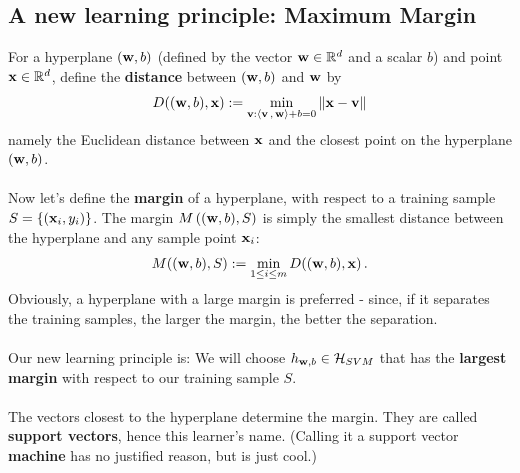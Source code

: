 \subsection{A new learning principle: Maximum Margin}


For a hyperplane $(\mathbf{w},b)$ (defined by the vector $\mathbf{w}\in\mathbb{R}^d$ and a
scalar $b$) and
point $\mathbf{x}\in\mathbb{R}^d$, define the {\bf distance} between $(\mathbf{w},b)$ and
$\mathbf{w}$ by 
\[
  D( (\mathbf{w},b) , \mathbf{x}) := \min_{\mathbf{v}:{\left\langle \mathbf{v}\,,\,\mathbf{w} \right\rangle}  +b=0  } \left\| \mathbf{x}-\mathbf{v}\right\|
\]
namely the Euclidean distance between $\mathbf{x}$ and the closest point on the
hyperplane $(\mathbf{w},b)$.
\\~\\
Now let's define the {\bf margin} of  a hyperplane, with respect to a training
sample $S=\left\{ \left( \mathbf{x}_i,y_i \right) \right\}$. The margin $M\left(
   (\mathbf{w},b) , S
 \right)$ is simply the smallest distance between the hyperplane and any sample
 point $\mathbf{x}_i$:
\[
  M( (\mathbf{w},b) , S) := \min_{1\leq i\leq m} D( (\mathbf{w},b) , \mathbf{x})\,.  
\]
Obviously, a hyperplane with a large margin is preferred - since, if it
separates the training samples, the larger the margin, the better the
separation.
\\~\\
Our new learning principle is: 
 We will choose $h_{\mathbf{w},b} \in
 \mathcal{H}_{SVM}$ that has the {\bf largest margin} with respect to our training sample $S$. 
\\~\\
The vectors closest to the hyperplane determine the margin. They are called {\bf
support vectors}, hence this learner's name. (Calling it a support vector {\bf
machine} has no justified reason, but is just cool.)

